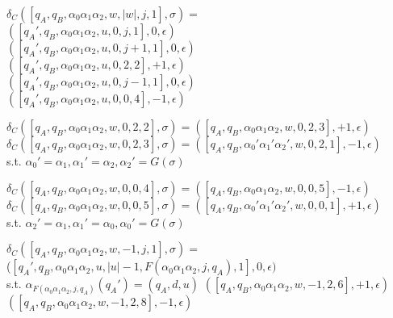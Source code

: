 \documentclass[12pt, a4paper]{article}
\begin{document}
\begin{algorithmic}
    \STATE $\delta_C([q_A, q_B, \alpha_0 \alpha_1 \alpha_2, w, |w|, j, 1], \sigma) =$\\
            \STATE $([q_A', q_B, \alpha_0 \alpha_1 \alpha_2, u, 0, j, 1], 0, \epsilon)$\\
                \STATE $([q_A', q_B, \alpha_0 \alpha_1 \alpha_2, u, 0, j+1, 1], 0, \epsilon)$\\
                \STATE $([q_A', q_B, \alpha_0 \alpha_1 \alpha_2, u, 0, 2, 2], +1, \epsilon)$\\
            \ENDIF
                \STATE $([q_A', q_B, \alpha_0 \alpha_1 \alpha_2, u, 0, j-1, 1], 0, \epsilon)$\\
                \STATE $([q_A', q_B, \alpha_0 \alpha_1 \alpha_2, u, 0, 0, 4], -1, \epsilon)$\\
            \ENDIF
        \ENDIF
    
    \STATE $\delta_C([q_A, q_B, \alpha_0 \alpha_1 \alpha_2, w, 0, 2, 2], \sigma) = ([q_A, q_B, \alpha_0 \alpha_1 \alpha_2, w, 0, 2, 3], +1, \epsilon)$\\
    \STATE $\delta_C([q_A, q_B, \alpha_0 \alpha_1 \alpha_2, w, 0, 2, 3], \sigma) = ([q_A, q_B, \alpha_0' \alpha_1' \alpha_2', w, 0, 2, 1], -1, \epsilon)$\\s.t. $\alpha_0' = \alpha_1, \alpha_1' = \alpha_2, \alpha_2' = G(\sigma)$
    
    \STATE $\delta_C([q_A, q_B, \alpha_0 \alpha_1 \alpha_2, w, 0, 0, 4], \sigma) = ([q_A, q_B, \alpha_0 \alpha_1 \alpha_2, w, 0, 0, 5], -1, \epsilon)$\\
    \STATE $\delta_C([q_A, q_B, \alpha_0 \alpha_1 \alpha_2, w, 0, 0, 5], \sigma) = ([q_A, q_B, \alpha_0' \alpha_1' \alpha_2', w, 0, 0, 1], +1, \epsilon)$\\s.t. $\alpha_2' = \alpha_1, \alpha_1' = \alpha_0, \alpha_0' = G(\sigma)$



    \STATE $\delta_C([q_A, q_B, \alpha_0 \alpha_1 \alpha_2, w, -1, j, 1], \sigma) =$\\
            \STATE ($[q_A', q_B, \alpha_0 \alpha_1 \alpha_2, u, |u|-1, F(\alpha_0 \alpha_1 \alpha_2, j, q_A), 1], 0, \epsilon)$\\s.t. $\alpha_{F(\alpha_0 \alpha_1 \alpha_2, j, q_A)}(q_A') = (q_A, d, u)$
            \STATE $([q_A, q_B, \alpha_0 \alpha_1 \alpha_2, w, -1, 2, 6], +1, \epsilon)$
            \STATE $([q_A, q_B, \alpha_0 \alpha_1 \alpha_2, w, -1, 2, 8], -1, \epsilon)$
        \ENDIF


\end{algorithmic}
\end{document}
